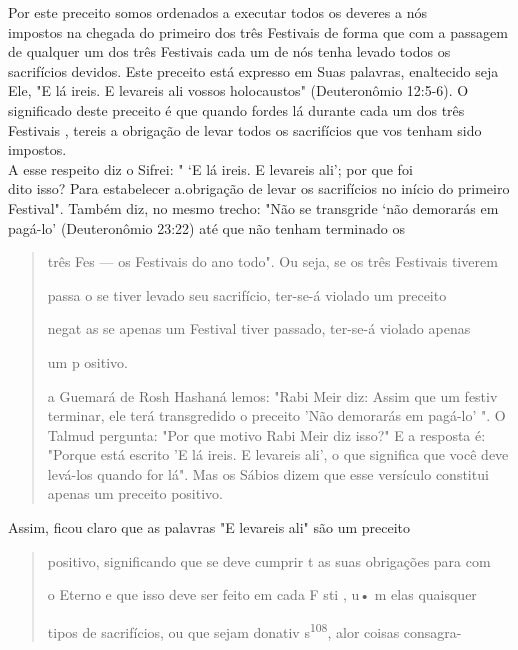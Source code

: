 Por este preceito somos ordenados a executar todos os deveres a nós\\
impostos na chegada do primeiro dos três Festivais de forma que com a
passagem
de qualquer um dos três Festivais cada um de nós tenha levado todos
os\\
sacrifícios devidos. Este preceito está expresso em Suas palavras,
enaltecido seja\\
Ele, "E lá ireis. E levareis ali vossos holocaustos" (Deuteronômio
12:5-6). O significado
deste preceito é que quando fordes lá durante cada um dos três
Festivais
, tereis a obrigação de levar todos os sacrifícios que vos tenham
sido impostos.\\
A esse respeito diz o Sifrei: " `E lá ireis. E levareis ali'; por que
foi\\
dito isso? Para estabelecer a.obrigação de levar os sacrifícios no
início do primeiro
Festival". Também diz, no mesmo trecho: "Não se transgride `não
demorarás
em pagá-lo' (Deuteronômio 23:22) até que não tenham terminado os

\begin{quote}
três Fes --- os Festivais do ano todo". Ou seja, se os três Festivais
tiverem

passa o se tiver levado seu sacrifício, ter-se-á violado um preceito

negat as se apenas um Festival tiver passado, ter-se-á violado apenas

um p ositivo.

a Guemará de Rosh Hashaná lemos: "Rabi Meir diz: Assim que um festiv
terminar, ele terá transgredido o preceito 'Não demorarás em pagá-lo' ".
O Talmud pergunta: "Por que motivo Rabi Meir diz isso?" E a resposta é:
"Por­que está escrito 'E lá ireis. E levareis ali', o que significa que
você deve levá-los quando for lá". Mas os Sábios dizem que esse
versículo constitui apenas um preceito positivo.
\end{quote}

Assim, ficou claro que as palavras "E levareis ali" são um preceito

\begin{quote}
positivo, significando que se deve cumprir t as suas obrigações para com

o Eterno e que isso deve ser feito em cada F sti , u• m elas quaisquer

tipos de sacrifícios, ou que sejam donativ s\textsuperscript{108}, alor
coisas consagra-
\end{quote}

